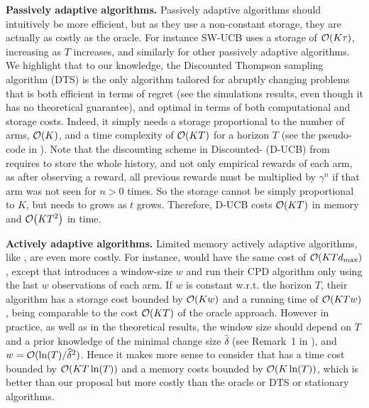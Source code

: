 \textbf{Passively adaptive algorithms.}
%
Passively adaptive algorithms should intuitively be more efficient, but as they use a non-constant storage, they are actually as costly as the oracle.
For instance SW-UCB uses a storage of $\mathop{}\mathopen{}\mathcal{O}\mathopen{}\left(K \tau\right)$, increasing as $T$ increases, and similarly for other passively adaptive algorithms.
We highlight that to our knowledge, the Discounted Thompson sampling algorithm (DTS) is the only algorithm tailored for abruptly changing problems that is both efficient in terms of regret (see the simulations results, even though it has no theoretical guarantee), and optimal in terms of both computational and storage costs. Indeed, it simply needs a storage proportional to the number of arms, $\mathop{}\mathopen{}\mathcal{O}\mathopen{}\left(K\right)$, and a time complexity of $\mathop{}\mathopen{}\mathcal{O}\mathopen{}\left(KT\right)$ for a horizon $T$ (see the pseudo-code in \cite{RajKalyani17}).
Note that the discounting scheme in Discounted-\UCB{} (D-UCB) from \cite{Kocsis06} requires to store the whole history, and not only empirical rewards of each arm, as after observing a reward, all previous rewards must be multiplied by $\gamma^n$ if that arm was not seen for $n>0$ times. So the storage cannot be simply proportional to $K$, but needs to grows as $t$ grows.
Therefore, D-UCB costs $\mathop{}\mathopen{}\mathcal{O}\mathopen{}\left(K T\right)$ in memory and $\mathop{}\mathopen{}\mathcal{O}\mathopen{}\left(K T^2\right)$ in time.


\textbf{Actively adaptive algorithms.}
%
Limited memory actively adaptive algorithms, like \MUCB, are even more costly.
For instance, \MUCB{} would have the same cost of $\mathop{}\mathopen{}\mathcal{O}\mathopen{}\left(K T d_{\max}\right)$, except that \cite{CaoZhenKvetonXie18} introduces a window-size $w$ and run their CPD algorithm only using the last $w$ observations of each arm. If $w$ is constant w.r.t. the horizon $T$, their algorithm has a storage cost bounded by $\mathop{}\mathopen{}\mathcal{O}\mathopen{}\left(K w\right)$ and a running time of $\mathop{}\mathopen{}\mathcal{O}\mathopen{}\left(K T w\right)$, being comparable to the cost $\mathop{}\mathopen{}\mathcal{O}\mathopen{}\left(K T\right)$ of the oracle approach.
However in practice, as well as in the theoretical results, the window size should depend on $T$ and a prior knowledge of the minimal change size $\widehat{\delta}$ (see Remark~1 in \cite{CaoZhenKvetonXie18}), and $w = \mathcal{O}(\ln(T) / \widehat{\delta}^2)$.
Hence it makes more sense to consider that \MUCB{} has a time cost bounded by $\mathop{}\mathopen{}\mathcal{O}\mathopen{}\left(K T \ln(T)\right)$ and a memory costs bounded by $\mathop{}\mathopen{}\mathcal{O}\mathopen{}\left(K \ln(T)\right)$, which is better than our proposal but more costly than the oracle or DTS or stationary algorithms.


